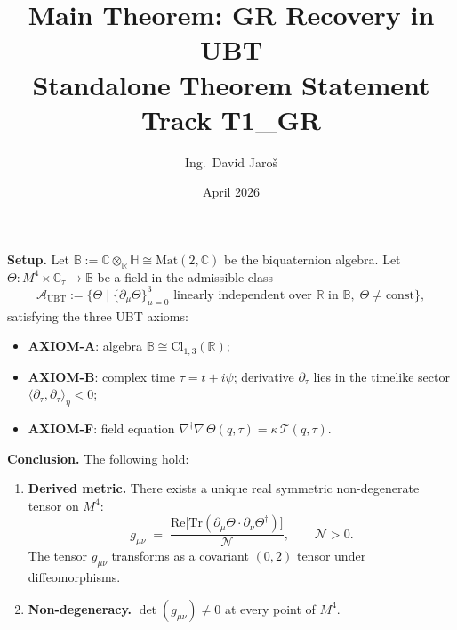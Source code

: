 \documentclass[12pt,a4paper]{article}
\title{\textbf{Main Theorem: GR Recovery in UBT}\\[4pt]
    \large Standalone Theorem Statement\\
    \normalsize Track T1\_GR}
\author{Ing.\ David Jaroš}
\date{April 2026}
\theoremstyle{remark}
\begin{document}
  \maketitle
\fi


\begin{tcolorbox}[enhanced,colback=blue!4!white,colframe=blue!55!black,
  arc=3pt,boxrule=1.2pt,
  title={\textbf{\large Main Theorem — GR Recovery (T1\_GR)}}]

\textbf{Setup.}
Let $\mathbb{B} := \mathbb{C}\otimes_{\mathbb{R}}\mathbb{H} \cong \mathrm{Mat}(2,\mathbb{C})$
be the biquaternion algebra.
Let $\Theta : M^4 \times \mathbb{C}_\tau \to \mathbb{B}$ be a field in the
admissible class
\[
  \mathcal{A}_{\mathrm{UBT}} := \bigl\{
    \Theta \;\big|\; \{\partial_\mu\Theta\}_{\mu=0}^3
    \text{ linearly independent over } \mathbb{R} \text{ in } \mathbb{B},\;
    \Theta \neq \mathrm{const}
  \bigr\},
\]
satisfying the three UBT axioms:
\begin{itemize}[leftmargin=*,noitemsep]
  \item \textbf{AXIOM-A}: algebra $\mathbb{B} \cong \mathrm{Cl}_{1,3}(\mathbb{R})$;
  \item \textbf{AXIOM-B}: complex time $\tau = t + i\psi$; derivative $\partial_\tau$
        lies in the timelike sector $\langle\partial_\tau,\partial_\tau\rangle_\eta < 0$;
  \item \textbf{AXIOM-F}: field equation
        $\nabla^\dagger\nabla\,\Theta(q,\tau) = \kappa\,\mathcal{T}(q,\tau)$.
\end{itemize}

\medskip
\textbf{Conclusion.}  The following hold:

\begin{enumerate}[label=\textbf{(\arabic*)}]

  \item \textbf{Derived metric.}  There exists a unique real symmetric
        non-degenerate tensor on $M^4$:
        \[
          g_{\mu\nu} \;=\;
          \dfrac{\mathrm{Re}\!\bigl[\mathrm{Tr}(\partial_\mu\Theta
            \cdot\partial_\nu\Theta^\dagger)\bigr]}{\mathcal{N}},
          \qquad \mathcal{N} > 0.
        \]
        The tensor $g_{\mu\nu}$ transforms as a covariant $(0,2)$ tensor under
        diffeomorphisms.

  \item \textbf{Non-degeneracy.}  $\det(g_{\mu\nu}) \neq 0$ at every point of $M^4$.


\end{enumerate}
\end{tcolorbox}
\end{document}
